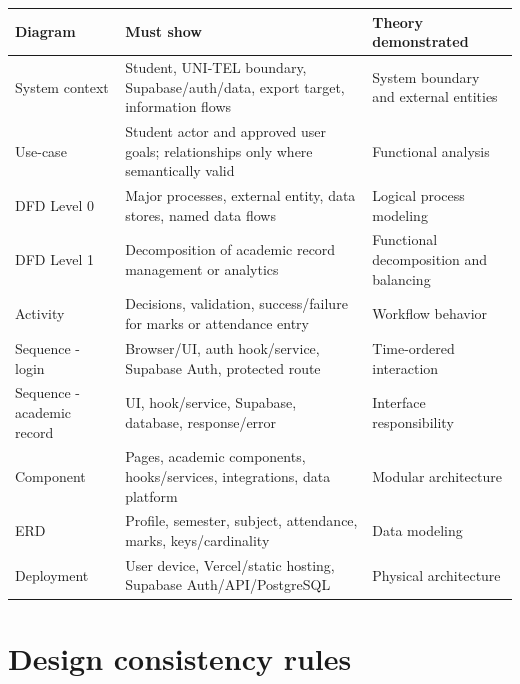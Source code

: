 \documentclass[
  10pt,
  a4paper,
  oneside]{report}
\newcounter{none} %
\begin{document}
{\def\LTcaptype{none} %
\begin{longtable}[]{@{}
  >{\raggedright\arraybackslash}p{}
  >{\raggedright\arraybackslash}p{}
  >{\raggedright\arraybackslash}p{}@{}}
\toprule\noalign{}
\begin{minipage}[b]{\linewidth}\raggedright
Diagram
\end{minipage} & \begin{minipage}[b]{\linewidth}\raggedright
Must show
\end{minipage} & \begin{minipage}[b]{\linewidth}\raggedright
Theory demonstrated
\end{minipage} \\
\midrule\noalign{}
\endhead
\bottomrule\noalign{}
\endlastfoot
System context & Student, UNI-TEL boundary, Supabase/auth/data, export
target, information flows & System boundary and external entities \\
Use-case & Student actor and approved user goals; relationships only
where semantically valid & Functional analysis \\
DFD Level 0 & Major processes, external entity, data stores, named data
flows & Logical process modeling \\
DFD Level 1 & Decomposition of academic record management or analytics &
Functional decomposition and balancing \\
Activity & Decisions, validation, success/failure for marks or
attendance entry & Workflow behavior \\
Sequence - login & Browser/UI, auth hook/service, Supabase Auth,
protected route & Time-ordered interaction \\
Sequence - academic record & UI, hook/service, Supabase, database,
response/error & Interface responsibility \\
Component & Pages, academic components, hooks/services, integrations,
data platform & Modular architecture \\
ERD & Profile, semester, subject, attendance, marks, keys/cardinality &
Data modeling \\
Deployment & User device, Vercel/static hosting, Supabase
Auth/API/PostgreSQL & Physical architecture \\
\end{longtable}
}

\section{Design consistency rules}\label{153-design-consistency-rules}
\end{document}
